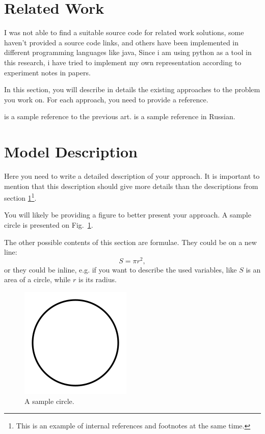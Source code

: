 \documentclass{article}
\begin{document}
\section{Related Work}
\label{sec:related}
I was not able to find a suitable source code for related work solutions, some haven't provided a source code links, and others have been implemented in different programming languages like java, 
Since i am using python as a tool in this research, i have tried to implement my own representation according to experiment notes in papers.

In this section, you will describe in details the existing approaches to the problem you work on. For each approach, you need to provide a reference. 

\cite{levenshtein1966binary} is a sample reference to the previous art. \cite{levenshtein1966dvoichnie} is a sample reference in Russian.

\section{Model Description}
Here you need to write a detailed description of your approach. It is important to mention that this description should give more details than the descriptions from section \ref{sec:related}\footnote{This is an example of internal references and footnotes at the same time.}. 

You will likely be providing a figure to better present your approach. A sample circle is presented on Fig.~\ref{fig:circle}.

The other possible contents of this section are formulae. They could be on a new line:
$$S=\pi r^2,$$
or they could be inline, e.g. if you want to describe the used variables, like $S$ is an area of a circle, while $r$ is its radius. 

\begin{figure}[!tbh]
    \centering
    \includegraphics[width=0.3\linewidth]{circle.png}
    \caption{A sample circle.}
    \label{fig:circle}
\end{figure}
\end{document}
